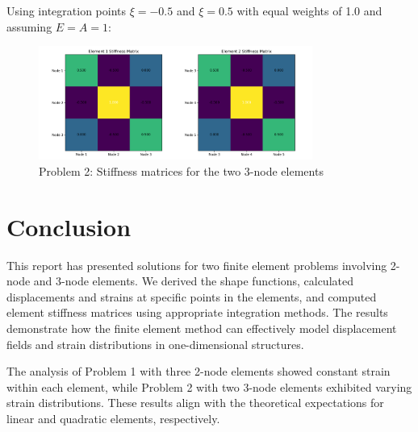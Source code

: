 \documentclass[12pt,a4paper]{article}
\begin{document}
Using integration points $\xi = -0.5$ and $\xi = 0.5$ with equal weights of 1.0 and assuming $E = A = 1$:

\begin{figure}[H]
\centering
\includegraphics[width=0.8\textwidth]{figures/ps3_problem2_stiffness.png}
\caption{Problem 2: Stiffness matrices for the two 3-node elements}
\label{fig:problem2_stiffness}
\end{figure}

\section{Conclusion}
This report has presented solutions for two finite element problems involving 2-node and 3-node elements. We derived the shape functions, calculated displacements and strains at specific points in the elements, and computed element stiffness matrices using appropriate integration methods. The results demonstrate how the finite element method can effectively model displacement fields and strain distributions in one-dimensional structures.

The analysis of Problem 1 with three 2-node elements showed constant strain within each element, while Problem 2 with two 3-node elements exhibited varying strain distributions. These results align with the theoretical expectations for linear and quadratic elements, respectively.
\end{document}
